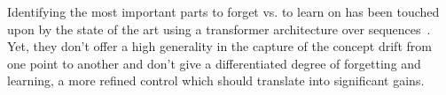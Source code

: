 Identifying the most important parts to forget vs. to learn on has been touched upon by the state of the art using a transformer architecture over sequences~\cite{zhang2020time}. Yet, they don't offer a high generality in the capture of the concept drift from one point to another and don't give a differentiated degree of forgetting and learning, a more refined control which should translate into significant gains.

% 
% 
% 

% 



% 





